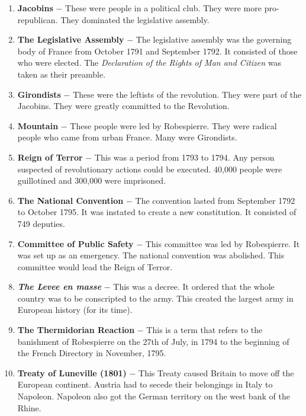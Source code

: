 \documentclass[12pt]{article}
\begin{document}
\begin{enumerate}
\item \textbf{Jacobins} $-$ These were people in a political club. They were more pro-republican. They dominated the legislative assembly.

\item \textbf{The Legislative Assembly} $-$ The legislative assembly was the governing body of France from October 1791 and September 1792. It consisted of those who were elected. The \textit{Declaration of the Rights of Man and Citizen} was taken as their preamble.

\item \textbf{Girondists} $-$ These were the leftists of the revolution. They were part of the Jacobins. They were greatly committed to the Revolution.

\item \textbf{Mountain} $-$ These people were led by Robespierre. They were radical people who came from urban France. Many were Girondists.

\item \textbf{Reign of Terror} $-$ This was a period from 1793 to 1794. Any person suspected of revolutionary actions could be executed. 40,000 people were guillotined and 300,000 were imprisoned.

\item \textbf{The National Convention} $-$ The convention lasted from September 1792 to October 1795. It was instated to create a new constitution. It consisted of 749 deputies.

\item \textbf{Committee of Public Safety} $-$ This committee was led by Robespierre. It was set up as an emergency. The national convention was abolished. This committee would lead the Reign of Terror.

\item \textbf{\textit{The Levee en masse}} $-$ This was a decree. It ordered that the whole country was to be conscripted to the army. This created the largest army in European history (for its time).

\item \textbf{The Thermidorian Reaction} $-$ This is a term that refers to the banishment of Robespierre on the 27th of July, in 1794 to the beginning of the French Directory in November, 1795.

\item \textbf{Treaty of Luneville (1801)} $-$ This Treaty caused Britain to move off the European continent. Austria had to secede their belongings in Italy to Napoleon. Napoleon also got the German territory on the west bank of the Rhine.


\end{enumerate}
\end{document}
